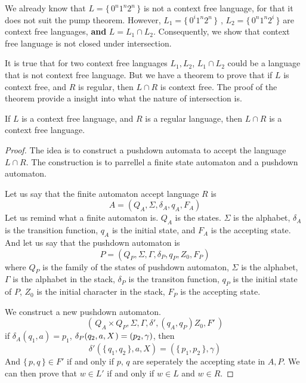 \documentclass[../main]{subfiles}
\begin{document}
\begin{exam}
	We already know that \( L  = \{ \,  0  ^{n} 1 ^{n} 2 ^{n} \,\}\) is not a context free language, for that it does not suit the 
	pump theorem. However, \( L_1 = \{ \, 0 ^{i}  1 ^{n} 2 ^{n} \,\}\)  , \( L_2 = \{ \, 0 ^{n} 1 ^{n} 2^{i} \, \}\) are context
	free languages, \textbf{and} \(L  = L_1 \cap L_2\). Consequently, we show that context free language is not closed under intersection.
\end{exam}
%
It is true that for two context free languages \(L_1 , L_2\), \(L_1 \cap L_2\) could be a language that is not context free language. 
But we have a theorem to prove that if \(L\) is context free, and \(R\) is regular, then \(L \cap R\) is context free. The proof of the 
theorem provide a insight into what the nature of intersection is. 
\begin{thm}
\label{Closure property with regular language}
If \(L\) is a context free language, and \(R\) is a regular language, then \(L \cap R\) is a context free language.
\end{thm}
\begin{proof}
The idea is to construct a pushdown automata to accept the language \( L \cap R\). The construction is 
to parrellel a finite state automaton and a pushdown automaton. 

Let us say that the finite automaton accept language \(R\) is 
\[
	A  = ( Q _{A}, \Sigma ,\delta _{A} , q _{A},  F_{A})
\]
Let us remind what a finite automaton is. \(Q _{A}\) is the states. \( \Sigma\) is the alphabet, \(\delta _{A}\) is the transition function, 
\(q _{A}\) is the initial state, and \(F _{A}\) is the accepting state. And let us say that the pushdown automaton is 
\[
	P = ( Q _{P} , \Sigma , \Gamma ,\delta_{P}, q _{P}, Z _{0}, F _{P})
\]
where \(Q _{P}\) is the family of the states of pushdown 
automaton, \( \Sigma\) is the alphabet, \( \Gamma\) is the alphabet
in the stack, \(\delta _{P}\) is the transiton function, \(q _{P}\)
is the initial state of \(P\), \(Z _{0}\) is the initial character 
in the stack, \( F_{P}\) is the accepting state.

We construct a new pushdown automaton. 
\[
	( \, Q _{A} \times Q _{P}, \Sigma, \Gamma,\delta ' , ( q _{A},  q _{P}) Z_{0} , F' \, )
\]
	if \(\delta _{A} ( q_1 , a) =  p_1\), \(\delta _{P} (q_2 , a , X\kern 1pt) = (p_2 ,\gamma)\), then 
	\[
		\delta ' (  \{ \, q_1 , q_2 \, \} , a ,X ) = 
		( \{ \, p_1 , p_2  \, \} ,\gamma)
	\] 
	And \( \{ \,  p , q \, \} \in F'\) if and only if 
	\(p\), \(q\) are seperately the accepting state in \(A, P\).
	We can then prove that \(w \in L '\)  if and only if 
	\( w \in L\) and \(w \in R\).
\end{proof}
\end{document}
